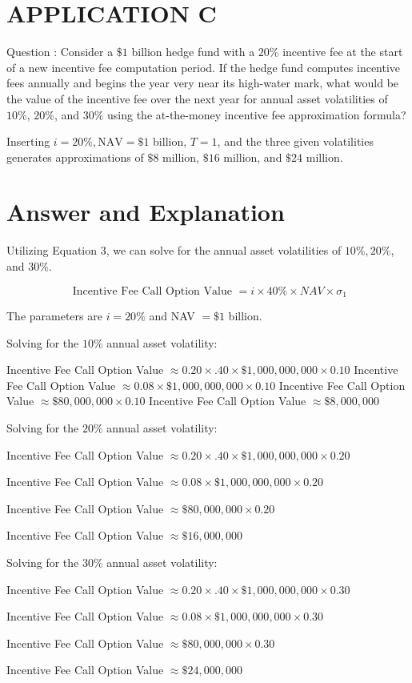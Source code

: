 \documentclass[11pt]{article}
\begin{document}
\section*{APPLICATION C}
Question : Consider a $\$ 1$ billion hedge fund with a $20 \%$ incentive fee at the start of a new incentive fee computation period. If the hedge fund computes incentive fees annually and begins the year very near its high-water mark, what would be the value of the incentive fee over the next year for annual asset volatilities of $10 \%$, $20 \%$, and $30 \%$ using the at-the-money incentive fee approximation formula?

Inserting $i=20 \%, \mathrm{NAV}=\$ 1$ billion, $T=1$, and the three given volatilities generates approximations of $\$ 8$ million, $\$ 16$ million, and $\$ 24$ million.

\section*{Answer and Explanation}
Utilizing Equation 3, we can solve for the annual asset volatilities of $10 \%, 20 \%$, and $30 \%$.

$$
\text { Incentive Fee Call Option Value }=i \times 40 \% \times N A V \times \sigma_{1}
$$

The parameters are $i=20 \%$ and NAV $=\$ 1$ billion.

Solving for the $10 \%$ annual asset volatility:

Incentive Fee Call Option Value $\approx 0.20 \times .40 \times \$ 1,000,000,000 \times 0.10$ Incentive Fee Call Option Value $\approx 0.08 \times \$ 1,000,000,000 \times 0.10$ Incentive Fee Call Option Value $\approx \$ 80,000,000 \times 0.10$ Incentive Fee Call Option Value $\approx \$ 8,000,000$

Solving for the $20 \%$ annual asset volatility:

Incentive Fee Call Option Value $\approx 0.20 \times .40 \times \$ 1,000,000,000 \times 0.20$

Incentive Fee Call Option Value $\approx 0.08 \times \$ 1,000,000,000 \times 0.20$

Incentive Fee Call Option Value $\approx \$ 80,000,000 \times 0.20$

Incentive Fee Call Option Value $\approx \$ 16,000,000$

Solving for the $30 \%$ annual asset volatility:

Incentive Fee Call Option Value $\approx 0.20 \times .40 \times \$ 1,000,000,000 \times 0.30$

Incentive Fee Call Option Value $\approx 0.08 \times \$ 1,000,000,000 \times 0.30$

Incentive Fee Call Option Value $\approx \$ 80,000,000 \times 0.30$

Incentive Fee Call Option Value $\approx \$ 24,000,000$
\end{document}
